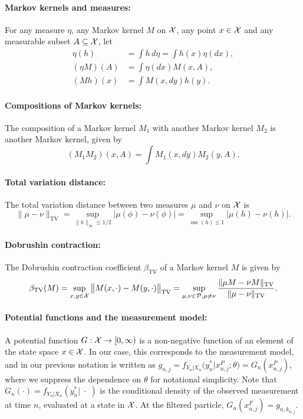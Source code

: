 \paragraph{\bf Markov kernels and measures:} For any measure $\eta$, any Markov kernel $M$ on ${\mathcal{X}}$, any point $x \in {\mathcal{X}}$ and any measurable subset $A \subseteq {\mathcal{X}}$, let 
\begin{align}
    \eta(h) &= \int h \, d\eta = \int h(x) \eta(dx), \\(\eta M)(A) &= \int \eta(dx)M(x,A), \\
    (Mh)(x) &= \int M(x, dy) h(y).
\end{align}

\paragraph{\bf Compositions of Markov kernels:} The composition of a Markov kernel $M_1$ with another Markov kernel $M_2$ is another Markov kernel, given by 
\begin{equation}
 (M_1M_2)(x, A) = \int M_1(x, dy) M_2(y, A).
\end{equation}

\paragraph{\bf Total variation distance:} The total variation distance between two measures $\mu$ and $\nu$ on ${\mathcal{X}}$ is
\begin{equation}
\|\mu-\nu\|_{\mathrm{TV}}=\sup _{\|h\|_{\infty} \leq 1 / 2}|\mu(\phi)-\nu(\phi)|=\sup _{\operatorname{osc}(h) \leq 1}|\mu(h)-\nu(h)|.    
\end{equation}

\paragraph{\bf Dobrushin contraction:} The Dobrushin contraction coefficient $\beta_{\text{TV}}$ of a Markov kernel $M$ is given by
\begin{equation}
\beta_{\mathrm{TV}}(M)=\sup _{x, y \in {\mathcal{X}}}\big\|M(x, \cdot)-M(y, \cdot)\big\|_{\mathrm{TV}}=\sup _{\mu, \nu \in \mathcal{P}, \mu \neq \nu} \frac{\|\mu M-\nu M\|_{\mathrm{TV}}}{\|\mu-\nu\|_{\mathrm{TV}}}.    
\end{equation}

\paragraph{\bf Potential functions and the measurement model:} A potential function $G : {\mathcal{X}} \to [0,\infty)$ is a non-negative function of an element of the state space $x \in {\mathcal{X}}$. 
In our case, this corresponds to the measurement model, and in our previous notation is written as $g_{n,j} = f_{Y_n|X_n}\big(y_n^*|x_{n,j}^P;\theta\big) = G_n(x_{n,j}^P)$, where we suppress the dependence on $\theta$ for notational simplicity.
Note that $G_n(\cdot) = f_{Y_n|X_n}(y_n^*|\;\cdot\;)$ is the conditional density of the observed measurement at time $n$, evaluated at a state in ${\mathcal{X}}$. At the filtered particle,
$G_n(x_{n,j}^F)=g_{n,k_{n,j}}$.

